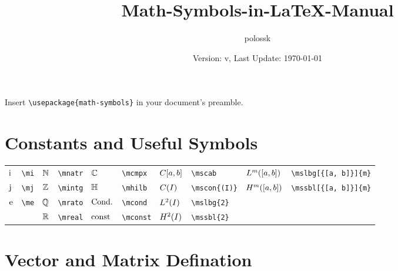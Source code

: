 \documentclass{article}
\title{Math-Symbols-in-\LaTeX{}-Manual}
\author{polossk}
\date{Version: v\artversion, Last Update: \today}
\begin{document}
\maketitle

Insert \lstinline`\usepackage{math-symbols}` in your document's preamble.

\tableofcontents
\thispagestyle{fancy}
\renewcommand{\baselinestretch}{1.25}
\section{Constants and Useful Symbols}
\begin{tabular}{*{10}{l}}
$\mi$ & \lstinline`\mi` & $\mnatr$ & \lstinline`\mnatr` & $\mcmpx$ & \lstinline`\mcmpx` & $\mscab$ & \lstinline`\mscab` & $\mslbg[{[a, b]}]{m}$ & \lstinline`\mslbg[{[a, b]}]{m}`\\
$\mj$ & \lstinline`\mj` & $\mintg$ & \lstinline`\mintg` & $\mhilb$ & \lstinline`\mhilb` & $\mscon{(I)}$ & \lstinline`\mscon{(I)}` & $\mssbl[{[a, b]}]{m}$ & \lstinline`\mssbl[{[a, b]}]{m}`\\
$\me$ & \lstinline`\me` & $\mrato$ & \lstinline`\mrato` & $\mcond$ & \lstinline`\mcond` & $\mslbg{2}$ & \lstinline`\mslbg{2}` & \\
 &  & $\mreal$ & \lstinline`\mreal` & $\mconst$ & \lstinline`\mconst` & $\mssbl{2}$ & \lstinline`\mssbl{2}` & \\
\end{tabular}

\section{Vector and Matrix Defination}
\end{document}
